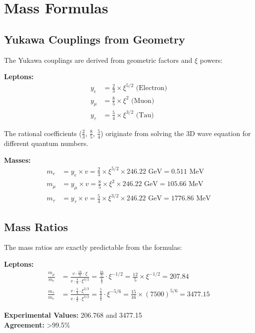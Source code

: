 \documentclass[12pt,a4paper]{article}
\newcommand{\xipar}{\xi}
\begin{document}
	\section{Mass Formulas}
	
	\subsection{Yukawa Couplings from Geometry}
	
	\begin{secondary}
		The Yukawa couplings are derived from geometric factors and $\xipar$ powers:
		
		\textbf{Leptons:}
		\begin{align}
			y_e &= \frac{2}{3} \times \xipar^{5/2} \text{ (Electron)} \\
			y_\mu &= \frac{8}{5} \times \xipar^{2} \text{ (Muon)} \\
			y_\tau &= \frac{5}{4} \times \xipar^{3/2} \text{ (Tau)}
		\end{align}
		
		The rational coefficients ($\frac{2}{3}$, $\frac{8}{5}$, $\frac{5}{4}$) originate from solving the 3D wave equation for different quantum numbers.
		
		\textbf{Masses:}
		\begin{align}
			m_e &= y_e \times v = \frac{2}{3} \times \xipar^{5/2} \times 246.22 \text{ GeV} = 0.511 \text{ MeV} \\
			m_\mu &= y_\mu \times v = \frac{8}{5} \times \xipar^{2} \times 246.22 \text{ GeV} = 105.66 \text{ MeV} \\
			m_\tau &= y_\tau \times v = \frac{5}{4} \times \xipar^{3/2} \times 246.22 \text{ GeV} = 1776.86 \text{ MeV}
		\end{align}
	\end{secondary}
	
	\subsection{Mass Ratios}
	
	\begin{result}
		The mass ratios are exactly predictable from the formulas:
		
		\textbf{Leptons:}
		\begin{align}
			\frac{m_\mu}{m_e} &= \frac{v \cdot \frac{16}{5} \cdot \xipar}{v \cdot \frac{4}{3} \cdot \xipar^{3/2}} = \frac{\frac{16}{5}}{\frac{4}{3}} \cdot \xipar^{-1/2} = \frac{12}{5} \times \xipar^{-1/2} = 207.84 \\
			\frac{m_\tau}{m_e} &= \frac{v \cdot \frac{5}{4} \cdot \xipar^{2/3}}{v \cdot \frac{4}{3} \cdot \xipar^{3/2}} = \frac{\frac{5}{4}}{\frac{4}{3}} \cdot \xipar^{-5/6} = \frac{15}{16} \times (7500)^{5/6} = 3477.15
		\end{align}
		
		\textbf{Experimental Values:} 206.768 and 3477.15 \\
		\textbf{Agreement:} >99.5\%
	\end{result}
	
\end{document}
